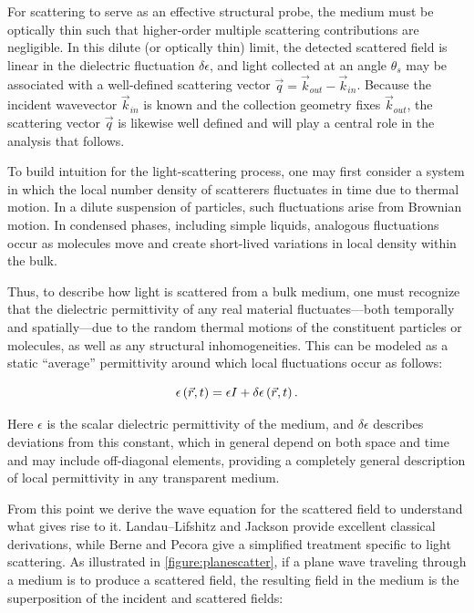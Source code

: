 For scattering to serve as an effective structural probe, the medium must be optically thin such that higher-order multiple scattering contributions are negligible. In this dilute (or optically thin) limit, the detected scattered field is linear in the dielectric fluctuation $\delta\epsilon$, and light collected at an angle $\theta_s$ may be associated with a well-defined scattering vector $\vec{q} = \vec{k}_{out} - \vec{k}_{in}$. Because the incident wavevector $\vec{k}_{in}$ is known and the collection geometry fixes $\vec{k}_{out}$, the scattering vector $\vec{q}$ is likewise well defined and will play a central role in the analysis that follows.

To build intuition for the light-scattering process, one may first consider a system in which the local number density of scatterers fluctuates in time due to thermal motion. In a dilute suspension of particles, such fluctuations arise from Brownian motion. In condensed phases, including simple liquids, analogous fluctuations occur as molecules move and create short-lived variations in local density within the bulk.

Thus, to describe how light is scattered from a bulk medium, one must recognize that the dielectric permittivity of any real material fluctuates—both temporally and spatially—due to the random thermal motions of the constituent particles or molecules, as well as any structural inhomogeneities. This can be modeled as a static ``average'' permittivity around which local fluctuations occur as follows:

\begin{equation}
	\centering
	\epsilon\left(\vec{r},t\right)=\epsilon I + \delta\epsilon\left(\vec{r},t\right).
	\label{eqn:dielectricflux}
\end{equation}

Here $\epsilon$ is the scalar dielectric permittivity of the medium, and $\delta\epsilon$ describes deviations from this constant, which in general depend on both space and time and may include off-diagonal elements, providing a completely general description of local permittivity in any transparent medium.  

From this point we derive the wave equation for the scattered field to understand what gives rise to it. Landau–Lifshitz and Jackson provide excellent classical derivations, while Berne and Pecora give a simplified treatment specific to light scattering\nolinebreak \cite{Landau,Jackson,Berne}. As illustrated in \fig \nolinebreak \ref{figure:planescatter}, if a plane wave traveling through a medium is to produce a scattered field, the resulting field in the medium is the superposition of the incident and scattered fields:

